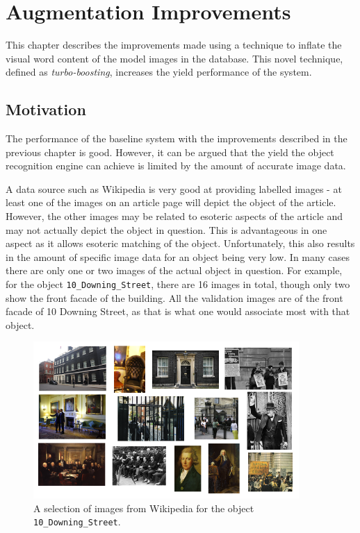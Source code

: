 \documentclass[11pt, onecolumn, a4paper, final]{report} %
\begin{document}
\chapter{Augmentation Improvements}
\label{chpt:turboboosting}
This chapter describes the improvements made using a technique to inflate the visual word content of the model images in the database. This novel technique, defined as \emph{turbo-boosting}, increases the yield performance of the system.

\section{Motivation}

The performance of the baseline system with the improvements described in the previous chapter is good. However, it can be argued that the yield the object recognition engine can achieve is limited by the amount of accurate image data. 

A data source such as Wikipedia is very good at providing labelled images - at least one of the images on an article page will depict the object of the article. However, the other images may be related to esoteric aspects of the article and may not actually depict the object in question. This is advantageous in one aspect as it allows esoteric matching of the object. Unfortunately, this also results in the amount of specific image data for an object being very low. In many cases there are only one or two images of the actual object in question. For example, for the object \lstinline!10_Downing_Street!, there are 16 images in total, though only two show the front facade of the building. All the validation images are of the front facade of 10 Downing Street, as that is what one would associate most with that object. 

\begin{figure}[htb]
\centering 
\includegraphics[width=0.9\textwidth]{images/10downingcollage.png}
\caption{A selection of images from Wikipedia for the object \lstinline!10_Downing_Street!.}
\label{fig:10downingcollage}
\end{figure}
\end{document}
